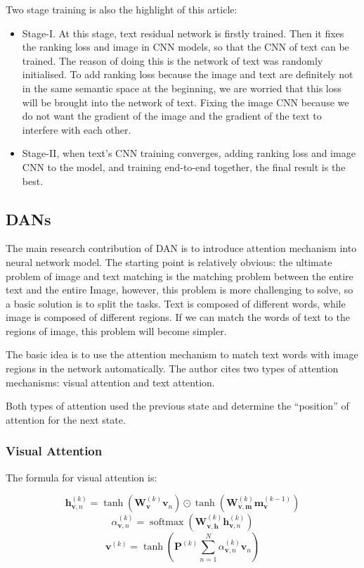Two stage training is also the highlight of this article:

\begin{itemize}
    \item Stage-I. At this stage, text residual network is firstly trained. Then it fixes the ranking loss and image in CNN models, so that the CNN of text can be trained. The reason of doing this is the network of text was randomly initialised. To add ranking loss because the image and text are definitely not in the same semantic space at the beginning, we are worried that this loss will be brought into the network of text. Fixing the image CNN because we do not want the gradient of the image and the gradient of the text to interfere with each other.
    
    \item Stage-II, when text's CNN training converges, adding ranking loss and image CNN to the model, and training end-to-end together, the final result is the best.
\end{itemize}

\subsection{DANs}

The main research contribution of DAN \cite{dan} is to introduce attention mechanism into neural network model. The starting point is relatively obvious: the ultimate problem of image and text matching is the matching problem between the entire text and the entire Image, however, this problem is more challenging to solve, so a basic solution is to split the tasks. Text is composed of different words, while image is composed of different regions. If we can match the words of text to the regions of image, this problem will become simpler.

The basic idea is to use the attention mechanism to match text words with image regions in the network automatically. The author cites two types of attention mechanisms: visual attention and text attention.

Both types of attention used the previous state and determine the ``position'' of attention for the next state.

\subsubsection{Visual Attention}
The formula for visual attention is:

$$
\mathbf{h}_{\mathbf{v}, n}^{(k)} =\tanh \left(\mathbf{W}_{\mathbf{v}}^{(k)} \mathbf{v}_{n}\right) \odot \tanh \left(\mathbf{W}_{\mathbf{v}, \mathbf{m}}^{(k)} \mathbf{m}_{\mathbf{v}}^{(k-1)}\right)
$$
$$
\alpha_{\mathbf{v}, n}^{(k)} =\operatorname{softmax}\left(\mathbf{W}_{\mathbf{v}, \mathbf{h}}^{(k)} \mathbf{h}_{\mathbf{v}, n}^{(k)}\right)
$$
$$
\mathbf{v}^{(k)} =\tanh \left(\mathbf{P}^{(k)} \sum_{n=1}^{N} \alpha_{\mathbf{v}, n}^{(k)} \mathbf{v}_{n}\right)
$$


